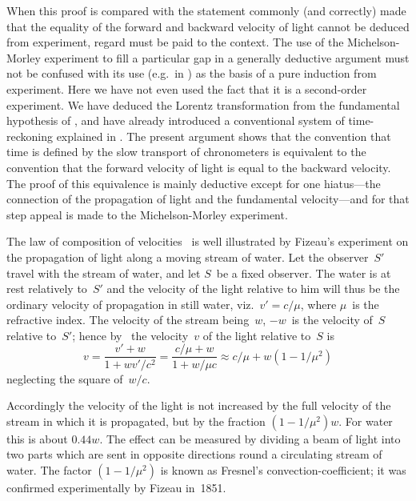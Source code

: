 \documentclass[12pt]{book}
\begin{document}
When this proof is compared with the statement commonly (and correctly)
made that the equality of the forward and backward velocity of light cannot
be deduced from experiment, regard must be paid to the context. The use
of the Michelson\hyp{}Morley experiment to fill a particular gap in a generally
deductive argument must not be confused with its use (e.g.\ in ) as the basis of a pure induction from experiment. Here we
have not even used the fact that it is a second\hyp{}order experiment. We have
deduced the Lorentz transformation from the fundamental hypothesis of ,
and have already introduced a conventional system of time\hyp{}reckoning explained
in . The present argument shows that the convention that time is defined
by the slow transport of chronometers is equivalent to the convention that
the forward velocity of light is equal to the backward velocity. The proof of
%
this equivalence is mainly deductive except for one hiatus---the connection
of the propagation of light and the fundamental velocity---and for that step
appeal is made to the Michelson\hyp{}Morley experiment.

The law of composition of velocities~ is well illustrated by Fizeau's
%
%
experiment on the propagation of light along a moving stream of water. Let
the observer~$S'$ travel with the stream of water, and let $S$~be a fixed observer.
The water is at rest relatively to~$S'$ and the velocity of the light relative to
him will thus be the ordinary velocity of propagation in still water, viz.\
$v' = c/\mu$, where $\mu$~is the refractive index. The velocity of the stream being~$w$,
$-w$~is the velocity of~$S$ relative to~$S'$; hence by~\Eq{(6.2)} the velocity~$v$ of the
light relative to~$S$ is
\[
  v = \frac{v' + w}{1 + wv'/c^2} = \frac{c/\mu + w}{1 + w/\mu c} \approx c/\mu + w(1 - 1/\mu^2)
\]
neglecting the square of~$w/c$.

Accordingly the velocity of the light is not increased by the full velocity
of the stream in which it is propagated, but by the fraction $(1 - 1/\mu^2) w$. For
water this is about $0.44 w$. The effect can be measured by dividing a beam
of light into two parts which are sent in opposite directions round a circulating
stream of water. The factor $(1 - 1/\mu^2)$ is known as Fresnel's convection\hyp{}coefficient;
\index{Fresnel's convection\hyp{}coefficient}%
it was confirmed experimentally by Fizeau in~1851.
\end{document}

